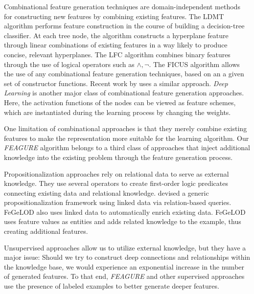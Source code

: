 \documentclass[letterpaper]{article} %
\theoremstyle{definition}
\begin{document}
Combinational feature generation techniques are domain-independent methods for constructing new features by combining existing features. The LDMT algorithm \cite{utgo1991linear} performs feature construction in the course of building a decision-tree classifier. At each tree node, the algorithm constructs a hyperplane feature through linear combinations of existing features in a way likely to produce concise, relevant hyperplanes. The LFC algorithm \cite{ragavan1993complex} combines binary features through the use of logical operators such as $\land ,\lnot$.
The FICUS algorithm \cite{markovitch2002feature} allows the use of any combinational feature generation techniques, based on an a given set of constructor functions. Recent work by \citeauthor{katz2016explorekit}  uses a similar approach.
\emph{Deep Learning} \cite{rumelhart1986learning,lecun1998gradient} is another major class of combinational feature generation approaches. Here, the activation functions of the nodes can be viewed as feature schemes, which are instantiated during the learning process by changing the weights.

One limitation of combinational approaches is that they merely combine existing features to make the representation more suitable for the 
learning algorithm. 
Our \emph{FEAGURE} algorithm belongs to a third class of approaches that inject additional knowledge into the existing problem through the feature generation process.

Propositionalization approaches  rely on relational data to serve as external knowledge. They use several operators to create first-order logic predicates connecting existing data and relational knowledge. 
\citeauthor{cheng2011automatedfull} devised a generic propositionalization framework  using linked data via relation-based queries. 
FeGeLOD \cite{paulheim2012unsupervisedfull} also uses linked data to automatically enrich existing data. 
FeGeLOD uses feature values as entities and adds related knowledge to the example,
thus creating additional features.

Unsupervised approaches allow us to utilize external knowledge, but they have a major issue: Should we try to construct deep connections and relationships within the knowledge base, we would experience an exponential increase in the number of generated features.
To that end, \emph{FEAGURE} and other supervised approaches use the presence of labeled examples to better generate deeper features.
\end{document}
